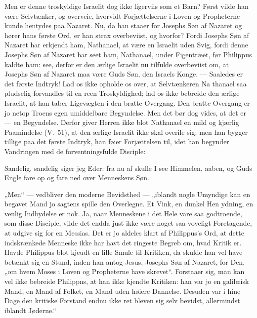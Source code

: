 \documentclass[12pt,a4paper]{book}
\begin{document}
Men er denne troskyldige Israelit dog ikke ligerviis som et Barn? Først vilde han være
Selvtænker, og overveie, hvorvidt Forjættelserne i Loven og Propheterne kunde hentydes
paa Nazaret. Nu, da han staaer for Josephs Søn af Nazaret og hører hans første Ord, er
han strax overbeviist, og hvorfor? Fordi Josephs Søn af Nazaret har erkjendt ham,
Nathanael, at være en Israelit uden Svig, fordi denne Josephs Søn af
Nazaret har seet ham, Nathanael, under Figentræet, før Philippus kaldte ham: see, derfor
er den ærlige Israelit nu tilfulde overbeviist om, at Josephs Søn af Nazaret maa være
Guds Søn, den Israels Konge. --- Saaledes er det første Indtryk! Lad os ikke opholde os
over, at Selvtænkeren Na\-%
thanael saa pludselig forvandles til en reen Troskyldighed; lad os ikke bebreide den
ærlige Israelit, at han taber Ligevægten i den bratte Overgang. Den bratte Overgang er jo
netop Troens egen umiddelbare Begyndelse. Men det bør dog vides, at det er --- en
Begyndelse. Derfor giver Herren ikke blot Nathanael en mild og kjærlig Paamindelse (V.\
51), at den ærlige Israelit ikke skal overile sig; men han bygger tillige paa det første
Indtryk, han føier Forjættelsen til, idet han begynder Vandringen med de
forventningsfulde Disciple:

\begingroup\large
Sandelig, sandelig siger jeg Eder: fra nu af skulle I see Himmelen, aaben, og Guds Engle
fare op og fare ned over Menneskens Søn.
\par\endgroup

„Men“ --- vedbliver den moderne Bevidsthed --- „iblandt nogle Umyndige kan en begavet
Mand jo sagtens spille den Overlegne. Et Vink, en dunkel Hen ydning, en venlig Indbydelse
er nok. Ja, naar Menneskene i det Hele vare saa godtroende, som disse Disciple, vilde det
endda just ikke være noget saa voveligt Foretagende, at udgive sig for en Messias. Det er
jo aldeles klart af Philippus's Ord, at dette indskrænkede Menneske ikke har havt det
ringeste Begreb om, hvad Kritik er. Havde Philippus blot kjeudt en lille Smule til
Kritiken, da skulde han vel have betænkt sig en Stund, inden han antog Jesus, Josephs Søn
af Nazaret, for Den, „om hvem Moses i Loven og Propheterne have skrevet“. Forstaaer sig,
man kan vel ikke bebreide Philippns, at han ikke kjendte Kritiken: han var jo en
galilæisk Mand, en Mand af Folket, en Mand uden høiere Dannelse. Desuden var i hine Dage
den kritiske Forstand endnu ikke ret bleven sig selv bevidst, allermindst iblandt
Jøderne.“
\end{document}
